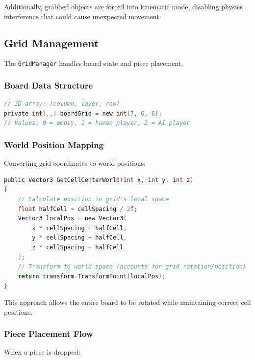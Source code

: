\documentclass[11pt]{article}
\begin{document}
Additionally, grabbed objects are forced into kinematic mode, disabling physics interference that could cause unexpected movement.

\subsection{Grid Management}

The \texttt{GridManager} handles board state and piece placement.

\subsubsection{Board Data Structure}

\begin{lstlisting}[language=C, caption=Board Representation]
// 3D array: [column, layer, row]
private int[,,] boardGrid = new int[7, 6, 6];
// Values: 0 = empty, 1 = human player, 2 = AI player
\end{lstlisting}

\subsubsection{World Position Mapping}

Converting grid coordinates to world positions:

\begin{lstlisting}[language=C, caption=Grid to World Conversion]
public Vector3 GetCellCenterWorld(int x, int y, int z)
{
    // Calculate position in grid's local space
    float halfCell = cellSpacing / 2f;
    Vector3 localPos = new Vector3(
        x * cellSpacing + halfCell,
        y * cellSpacing + halfCell,
        z * cellSpacing + halfCell
    );
    // Transform to world space (accounts for grid rotation/position)
    return transform.TransformPoint(localPos);
}
\end{lstlisting}

This approach allows the entire board to be rotated while maintaining correct cell positions.

\subsubsection{Piece Placement Flow}

When a piece is dropped:
\end{document}
